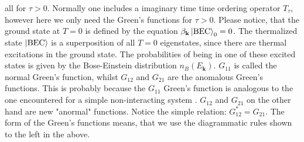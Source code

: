all for $\tau > 0$. Normally one includes a imaginary time time ordering operator $T_\tau$, however here we only need the Green's functions for $\tau > 0$. Please notice, that the ground state at $T=0$ is defined by the equation $\beta_\mathbf{k}\ket{\text{BEC}}_0 = 0$. The thermalized state $\ket{\text{BEC}}$ is a superposition of all $T=0$ eigenstates, since there are thermal excitations in the ground state. The probabilities of being in one of these excited states is given by the Bose-Einstein distribution $n_B(E_\mathbf{k})$. $G_{11}$ is called the normal Green's function, whilst $G_{12}$ and $G_{21}$ are the anomalous Green's functions. This is probably because the $G_{11}$ Green's function is analogous to the one encountered for a simple non-interacting system \cite{BruusFlensberg}. $G_{12}$ and $G_{21}$ on the other hand are new "anormal" functions. Notice the simple relation: $G_{12}^* = G_{21}$. The form of the Green's functions means, that we use the diagrammatic rules shown to the left in the above.

